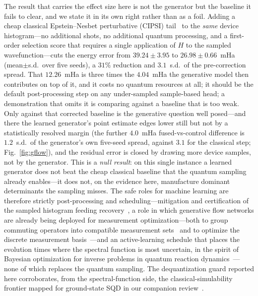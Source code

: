 The result that carries the effect size here is not the generator but the baseline it fails to clear, and we
state it in its own right rather than as a foil. Adding a cheap classical Epstein--Nesbet perturbative
(CIPSI) tail~\cite{cipsi1973} to the \emph{same} device histogram---no additional shots, no additional
quantum processing, and a first-order selection score that requires a single application of $H$ to the
sampled wavefunction---cuts the energy error from $39.24\pm3.95$ to $26.98\pm0.66$~mHa (mean$\pm$s.d.\ over five
seeds), a $31\%$ reduction and $3.1$~s.d.\ of the pre-correction spread. That $12.26$~mHa is three times
the $4.04$~mHa the generative model then contributes on top of it, and it costs no quantum resources at
all; it should be the default post-processing step on any under-sampled sample-based head; a demonstration that omits it is
comparing against a baseline that is too weak. Only against that corrected baseline is the generative
question well posed---and there the learned generator's point estimate edges lower still but not by a
statistically resolved margin (the further $4.0$~mHa fused-vs-control difference is $1.2$~s.d.\ of the
generator's own five-seed spread, against $3.1$ for the classical step; Fig.~\ref{fig:gflow}), and the residual
error is closed by drawing more device samples, not by the generator. This is a
\emph{null result}: on this single instance a learned generator does not beat the cheap classical baseline
that the quantum sampling already enables---it does not, on the evidence here, manufacture dominant
determinants the sampling misses. The safe roles for machine learning are therefore strictly
post-processing and scheduling---mitigation and certification of the sampled histogram feeding
recovery~\cite{qesem2025,algorithmiq2026}, a role in which generative flow networks are already being
deployed for measurement optimization---both to group commuting operators into compatible measurement
sets~\cite{vargashernandez2024} and to optimize the discrete measurement
basis~\cite{vargashernandez2025}---and an active-learning schedule that
places the evolution times where the spectral function is most uncertain, in the spirit of Bayesian
optimization for inverse problems in quantum reaction dynamics~\cite{vargashernandez2019}---none of which replaces the quantum
sampling. The dequantization guard reported here corroborates, from the spectral-function side, the
classical-simulability frontier mapped for ground-state SQD in our companion review~\cite{review}.

